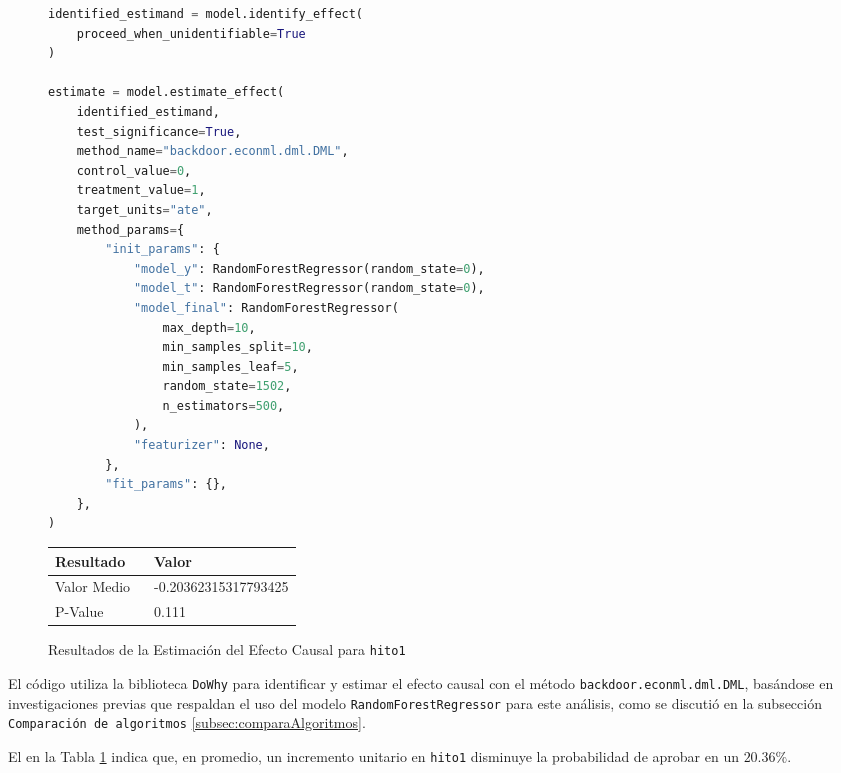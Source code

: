 \begin{figure}[H]
    \centering
    \begin{minipage}{0.5\textwidth}
        \begin{lstlisting}[language=Python, caption=Proceso de Identificación y Estimación del Efecto Causal, label=lst:IdentificarEstimarefectoCausalHito1]
identified_estimand = model.identify_effect(
    proceed_when_unidentifiable=True
)

estimate = model.estimate_effect(
    identified_estimand,
    test_significance=True,
    method_name="backdoor.econml.dml.DML",
    control_value=0,
    treatment_value=1,
    target_units="ate",
    method_params={
        "init_params": {
            "model_y": RandomForestRegressor(random_state=0),
            "model_t": RandomForestRegressor(random_state=0),
            "model_final": RandomForestRegressor(
                max_depth=10,
                min_samples_split=10,
                min_samples_leaf=5,
                random_state=1502,
                n_estimators=500,
            ),
            "featurizer": None,
        },
        "fit_params": {},
    },
)
\end{lstlisting}
    \end{minipage}
    \hfill
    \begin{minipage}{0.45\textwidth}
        \centering        
        \begin{tabular}{lp{0.6\linewidth}}
            \toprule
            \textbf{Resultado} & \textbf{Valor} \\
            \midrule
            Valor Medio & -0.20362315317793425 \\
            P-Value & 0.111 \\
            \bottomrule
        \end{tabular}
        \caption{Resultados de la Estimación del Efecto Causal para \texttt{hito1}}
        \label{tab:efecto_causal_hito1}
    \end{minipage}
\end{figure}

El código utiliza la biblioteca \texttt{DoWhy} para identificar y estimar el efecto causal con el método \texttt{backdoor.econml.dml.DML}, basándose en investigaciones previas que respaldan el uso del modelo \texttt{RandomForestRegressor} para este análisis, como se discutió en la subsección \texttt{Comparación de algoritmos} \ref{subsec:comparaAlgoritmos}.

El  en la Tabla \ref{tab:efecto_causal_hito1} indica que, en promedio, un incremento unitario en \texttt{hito1} disminuye la probabilidad de aprobar en un \(20.36\% \).

